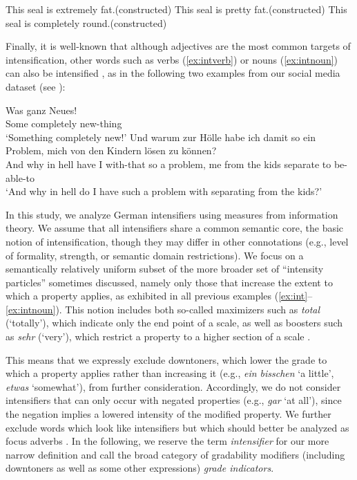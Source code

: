 \documentclass[output=paper,colorlinks,citecolor=brown]{langscibook}
\begin{document}
\ea\label{ex:intincrease}
This seal is extremely fat.\hfill(constructed)
\ex\label{ex:intdecrease}
This seal is pretty fat.\hfill(constructed)
\ex\label{ex:nongradable}
This seal is completely round.\hfill(constructed)
\z

Finally, it is well-known that although adjectives are the most common targets of intensification, other words such as verbs (\ref{ex:intverb}) or nouns (\ref{ex:intnoun}) can also be intensified \citep[see][]{bolinger_degree_1972}, as in the following two examples from our social media dataset (see ):

\ea\label{ex:intnoun}
\ea
\gll Was ganz Neues!\\
Some completely new-thing\\
\glt `Something completely new!'
\ex 
\gll Und warum zur Hölle habe ich damit so ein Problem, mich von den Kindern lösen zu können?\\
And why in hell have I with-that so a problem, me from the kids separate to be-able-to\\
\glt `And why in hell do I have such a problem with separating from the kids?'
\z
\z

In this study, we analyze German intensifiers using measures from information theory. We assume that all intensifiers share a common semantic core, the basic notion of intensification, though they may differ in other connotations (e.g., level of formality, strength, or semantic domain restrictions). We focus on a semantically relatively uniform subset of the more broader set of ``intensity particles'' \citep{breindl2007intensitatspartikeln} sometimes discussed, namely only those that increase the extent to which a property applies, as exhibited in all previous examples (\ref{ex:int}--\ref{ex:intnoun}). This notion includes both so-called maximizers such as \textit{total} (`totally'), which indicate only the end point of a scale, as well as boosters such as \textit{sehr} (`very'), which restrict a property to a higher section of a scale \citep{bolinger_degree_1972}.

This means that we expressly exclude downtoners, which lower the grade to which a property applies rather than increasing it (e.g., \textit{ein bisschen} `a little', \textit{etwas} `somewhat'), from further consideration. Accordingly, we do not consider intensifiers that can only occur with negated properties (e.g., \textit{gar} `at all'), since the negation implies a lowered intensity of the modified property. We further exclude words which look like intensifiers but which should better be analyzed as focus adverbs \citep[\textit{einfach} `simply', \textit{echt}, \textit{wirklich} `really'; see][]{beltrama2022,scherihou2022}. In the following, we reserve the term \textit{intensifier} for our more narrow definition  and call the broad category of gradability modifiers (including downtoners as well as some other expressions) \textit{grade indicators}.
\end{document}
